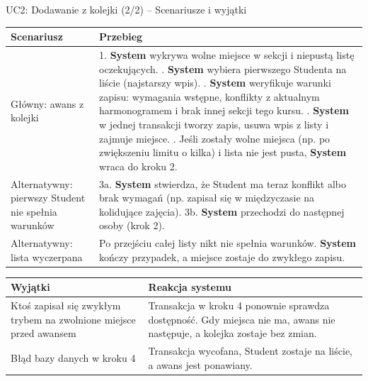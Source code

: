 \documentclass[aspectratio=169, 10pt, xcolor=table]{beamer}
\renewcommand{\arraystretch}{1.18}
\begin{document}
\begin{frame}[shrink=5]{UC2: Dodawanie z kolejki (2/2) -- Scenariusze i wyjątki}
    \scriptsize
    \renewcommand{\arraystretch}{1.08}
    \begin{tabularx}{\textwidth}{|U{3.5cm}|Y|}
        \hline
        \textcolor{NavyPrimary}{\textbf{Scenariusz}} & \textcolor{NavyPrimary}{\textbf{Przebieg}} \\
        \hline
        Główny: awans z kolejki &
        1. \textbf{System} wykrywa wolne miejsce w sekcji i niepustą listę oczekujących. . \textbf{System} wybiera pierwszego Studenta na liście (najstarszy wpis). . \textbf{System} weryfikuje warunki zapisu: wymagania wstępne, konflikty z aktualnym harmonogramem i brak innej sekcji tego kursu. . \textbf{System} w jednej transakcji tworzy zapis, usuwa wpis z listy i zajmuje miejsce. . Jeśli zostały wolne miejsca (np. po zwiększeniu limitu o kilka) i lista nie jest pusta, \textbf{System} wraca do kroku 2. \\
        \hline
        Alternatywny: pierwszy Student nie spełnia warunków &
        3a. \textbf{System} stwierdza, że Student ma teraz konflikt albo brak wymagań (np. zapisał się w międzyczasie na kolidujące zajęcia). \newline
        3b. \textbf{System} przechodzi do następnej osoby (krok 2). \\
        \hline
        Alternatywny: lista wyczerpana &
        Po przejściu całej listy nikt nie spełnia warunków. \textbf{System} kończy przypadek, a miejsce zostaje do zwykłego zapisu. \\
        \hline
    \end{tabularx}

    \vspace{3pt}
    \begin{tabularx}{\textwidth}{|U{4.3cm}|Y|}
        \hline
        \textcolor{NavyPrimary}{\textbf{Wyjątki}} & \textcolor{NavyPrimary}{\textbf{Reakcja systemu}} \\
        \hline
        Ktoś zapisał się zwykłym trybem na zwolnione miejsce przed awansem & Transakcja w kroku 4 ponownie sprawdza dostępność. Gdy miejsca nie ma, awans nie następuje, a kolejka zostaje bez zmian. \\
        \hline
        Błąd bazy danych w kroku 4 & Transakcja wycofana, Student zostaje na liście, a awans jest ponawiany. \\
        \hline
    \end{tabularx}
\end{frame}
\end{document}
